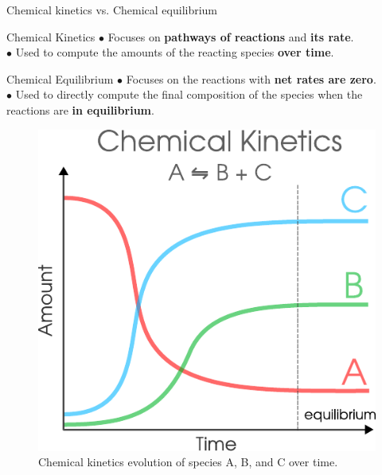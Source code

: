\begin{frame}{Chemical kinetics vs. Chemical equilibrium}
%
\small
\lcol
\vskip 10pt
\begin{cbox}{Chemical Kinetics}
$\bullet$ Focuses on \alert{\textbf{pathways of reactions}} and  \alert{\textbf{its rate}}. \\
$\bullet$ Used to compute the amounts of the reacting species \alert{\textbf{over time}}. \\
\end{cbox}

\begin{cbox}{Chemical Equilibrium} 
$\bullet$ Focuses on the reactions with \alert{\textbf{net rates are zero}}. \\
$\bullet$ Used to directly compute the final composition of the species when
the reactions are \alert{\textbf{in equilibrium}}. 
\end{cbox}

\rcol

\vskip 10pt
\begin{figure}
\centering
\includegraphics[width=0.8\columnwidth]{figures/applications/chemical-kinetics-equilibrium-illustration-evolution-plot}
\caption*{Chemical kinetics evolution of species A, B, and C over time.}
\end{figure}

\ecol

\end{frame}


